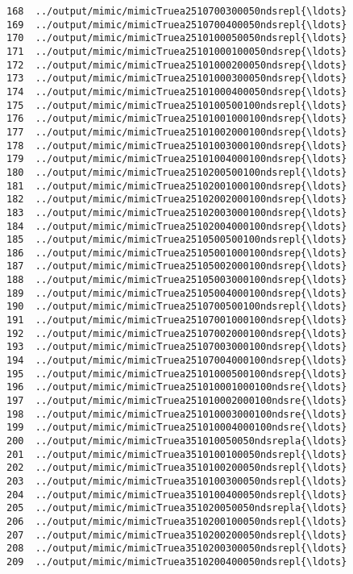 \documentclass[11pt]{article}
\begin{document}
\begin{Verbatim}[commandchars=\\\{\}]
168  ../output/mimic/mimicTruea2510700300050ndsrepl{\ldots}  
169  ../output/mimic/mimicTruea2510700400050ndsrepl{\ldots}  
170  ../output/mimic/mimicTruea2510100050050ndsrepl{\ldots}  
171  ../output/mimic/mimicTruea25101000100050ndsrep{\ldots}  
172  ../output/mimic/mimicTruea25101000200050ndsrep{\ldots}  
173  ../output/mimic/mimicTruea25101000300050ndsrep{\ldots}  
174  ../output/mimic/mimicTruea25101000400050ndsrep{\ldots}  
175  ../output/mimic/mimicTruea2510100500100ndsrepl{\ldots}  
176  ../output/mimic/mimicTruea25101001000100ndsrep{\ldots}  
177  ../output/mimic/mimicTruea25101002000100ndsrep{\ldots}  
178  ../output/mimic/mimicTruea25101003000100ndsrep{\ldots}  
179  ../output/mimic/mimicTruea25101004000100ndsrep{\ldots}  
180  ../output/mimic/mimicTruea2510200500100ndsrepl{\ldots}  
181  ../output/mimic/mimicTruea25102001000100ndsrep{\ldots}  
182  ../output/mimic/mimicTruea25102002000100ndsrep{\ldots}  
183  ../output/mimic/mimicTruea25102003000100ndsrep{\ldots}  
184  ../output/mimic/mimicTruea25102004000100ndsrep{\ldots}  
185  ../output/mimic/mimicTruea2510500500100ndsrepl{\ldots}  
186  ../output/mimic/mimicTruea25105001000100ndsrep{\ldots}  
187  ../output/mimic/mimicTruea25105002000100ndsrep{\ldots}  
188  ../output/mimic/mimicTruea25105003000100ndsrep{\ldots}  
189  ../output/mimic/mimicTruea25105004000100ndsrep{\ldots}  
190  ../output/mimic/mimicTruea2510700500100ndsrepl{\ldots}  
191  ../output/mimic/mimicTruea25107001000100ndsrep{\ldots}  
192  ../output/mimic/mimicTruea25107002000100ndsrep{\ldots}  
193  ../output/mimic/mimicTruea25107003000100ndsrep{\ldots}  
194  ../output/mimic/mimicTruea25107004000100ndsrep{\ldots}  
195  ../output/mimic/mimicTruea25101000500100ndsrep{\ldots}  
196  ../output/mimic/mimicTruea251010001000100ndsre{\ldots}  
197  ../output/mimic/mimicTruea251010002000100ndsre{\ldots}  
198  ../output/mimic/mimicTruea251010003000100ndsre{\ldots}  
199  ../output/mimic/mimicTruea251010004000100ndsre{\ldots}  
200  ../output/mimic/mimicTruea351010050050ndsrepla{\ldots}  
201  ../output/mimic/mimicTruea3510100100050ndsrepl{\ldots}  
202  ../output/mimic/mimicTruea3510100200050ndsrepl{\ldots}  
203  ../output/mimic/mimicTruea3510100300050ndsrepl{\ldots}  
204  ../output/mimic/mimicTruea3510100400050ndsrepl{\ldots}  
205  ../output/mimic/mimicTruea351020050050ndsrepla{\ldots}  
206  ../output/mimic/mimicTruea3510200100050ndsrepl{\ldots}  
207  ../output/mimic/mimicTruea3510200200050ndsrepl{\ldots}  
208  ../output/mimic/mimicTruea3510200300050ndsrepl{\ldots}  
209  ../output/mimic/mimicTruea3510200400050ndsrepl{\ldots}  

\end{Verbatim}
\end{document}
